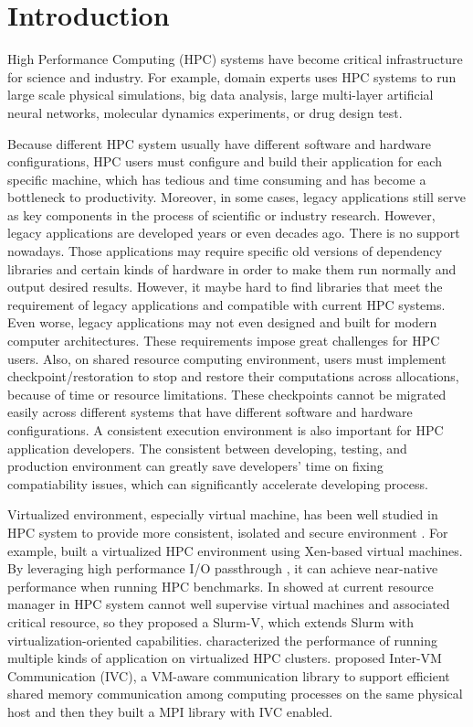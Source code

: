 \section{Introduction}
  \label{sec:introduction}

High Performance Computing (HPC) systems have become critical infrastructure for science and industry. For example, domain experts uses HPC systems to run large scale physical simulations, big data analysis, large multi-layer artificial neural networks, molecular dynamics experiments, or drug design test.

Because different HPC system usually have different software and hardware configurations, HPC users must configure and build their application for each specific machine, which has tedious and time consuming and has become a bottleneck to productivity. Moreover, in some cases, legacy applications still serve as key components in the process of scientific or industry research.  However, legacy applications are developed years or even decades ago. There is no support nowadays. Those applications may require specific old versions of dependency libraries and certain kinds of hardware in order to make them run normally and output desired results. However, it maybe hard to find libraries that meet the requirement of legacy applications and compatible with current HPC systems. Even worse, legacy applications may not even designed and built for modern computer architectures. These requirements impose great challenges for HPC users.  Also, on shared resource computing environment, users must implement checkpoint/restoration to stop and restore their computations across allocations, because of time or resource limitations.  These checkpoints cannot be migrated easily across different systems that have different software and hardware configurations. A consistent execution environment is also important for HPC application developers. The consistent between developing, testing, and production environment can greatly save developers' time on fixing compatiability issues, which can significantly accelerate developing process.


Virtualized environment, especially virtual machine, has been well studied in HPC system to provide more consistent, isolated and secure environment \cite{vallee2008system, reuther2012hpc}. For example, \cite{huang2006case} built a virtualized HPC environment using Xen-based virtual machines. By leveraging high performance I/O passthrough \cite{liu2006high}, it can achieve near-native performance when running HPC benchmarks. In \cite{zhang2016slurm} showed at current resource manager in HPC system cannot well supervise virtual machines and associated critical resource, so they proposed a Slurm-V, which extends Slurm with virtualization-oriented capabilities. \cite{gugnani2016performance, tikotekar2008analysis} characterized the performance  of running multiple kinds of application on virtualized HPC clusters. \cite{} proposed Inter-VM Communication (IVC), a VM-aware communication library to support efficient shared memory communication among computing processes on the same physical host and then they built a MPI library with IVC enabled.

